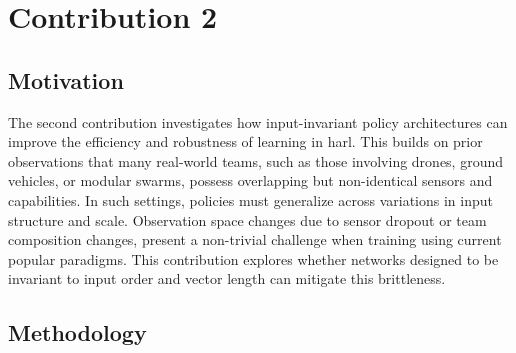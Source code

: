 


\section{Contribution 2}

\subsection{Motivation}

The second contribution investigates how input-invariant policy architectures 
can improve the efficiency and robustness of learning in \gls{harl}.
This builds on prior observations that many real-world teams,
such as those involving drones, ground vehicles, or modular swarms,
possess overlapping but non-identical sensors and capabilities. In such settings, 
policies must generalize across variations in input structure and scale. 
Observation space changes due to sensor dropout or team composition changes,
present a non-trivial challenge when training using current popular paradigms. 
This contribution explores whether networks designed to be invariant to 
input order and vector length can mitigate this brittleness.

\subsection{Methodology}

